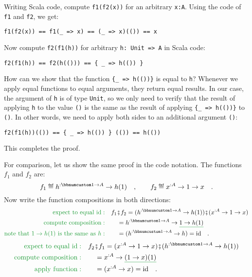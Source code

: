 Writing Scala code, compute \lstinline!f1(f2(x))! for an arbitrary
\lstinline!x:A!. Using the code of \lstinline!f1! and \lstinline!f2!,
we get:
\begin{lstlisting}
f1(f2(x)) == f1(_ => x) == (_ => x)(()) == x
\end{lstlisting}
Now compute \lstinline!f2(f1(h))! for arbitrary \lstinline!h: Unit => A!
in Scala code:
\begin{lstlisting}
f2(f1(h)) == f2(h(())) == { _ => h(()) }
\end{lstlisting}
How can we show that the function \lstinline!{_ => h(())}! is equal
to \lstinline!h!? Whenever we apply equal functions to equal arguments,
they return equal results. In our case, the argument of \lstinline!h!
is of type \lstinline!Unit!, so we only need to verify that the result
of applying \lstinline!h! to the value \lstinline!()! is the same
as the result of applying \lstinline!{_ => h(())}! to \lstinline!()!.
In other words, we need to apply both sides to an additional argument
\lstinline!()!:
\begin{lstlisting}
f2(f1(h))(()) == { _ => h(()) } (()) == h(())
\end{lstlisting}
This completes the proof.

For comparison, let us show the same proof in the code notation. The
functions $f_{1}$ and $f_{2}$ are:
\[
f_{1}\triangleq h^{:\bbnum 1\rightarrow A}\rightarrow h(1)\quad,\quad\quad f_{2}\triangleq x^{:A}\rightarrow1\rightarrow x\quad.
\]
Now write the function compositions in both directions:
\begin{align*}
{\color{greenunder}\text{expect to equal }\text{id}:}\quad & f_{1}\bef f_{2}=(h^{:\bbnum 1\rightarrow A}\rightarrow h(1))\bef(x^{:A}\rightarrow1\rightarrow x)\\
{\color{greenunder}\text{compute composition}:}\quad & \quad=h^{:\bbnum 1\rightarrow A}\rightarrow\gunderline{1\rightarrow h(1)}\\
{\color{greenunder}\text{note that }1\rightarrow h(1)\text{ is the same as }h:}\quad & \quad=(h^{:\bbnum 1\rightarrow A}\rightarrow h)=\text{id}\quad.
\end{align*}
\begin{align*}
{\color{greenunder}\text{expect to equal }\text{id}:}\quad & f_{2}\bef f_{1}=(x^{:A}\rightarrow1\rightarrow x)\bef(h^{:\bbnum 1\rightarrow A}\rightarrow h(1))\\
{\color{greenunder}\text{compute composition}:}\quad & \quad=x^{:A}\rightarrow\gunderline{(1\rightarrow x)(1)}\\
{\color{greenunder}\text{apply function}:}\quad & \quad=(x^{:A}\rightarrow x)=\text{id}\quad.
\end{align*}

